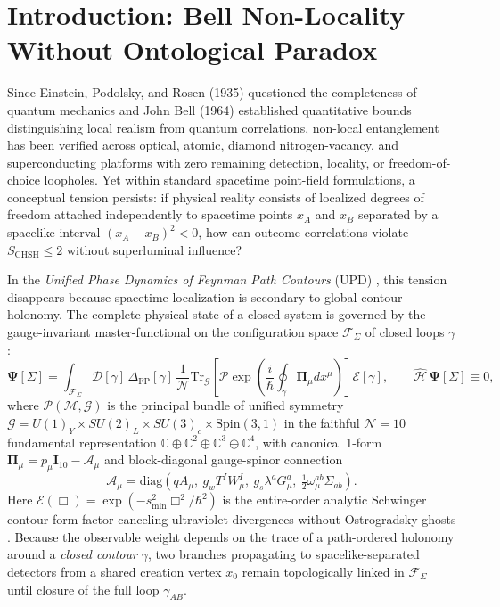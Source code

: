 \documentclass[11pt,a4paper]{article}
\begin{document}
\section{Introduction: Bell Non-Locality Without Ontological Paradox}
Since Einstein, Podolsky, and Rosen (1935) questioned the completeness of quantum mechanics and John Bell (1964) established quantitative bounds distinguishing local realism from quantum correlations, non-local entanglement has been verified across optical, atomic, diamond nitrogen-vacancy, and superconducting platforms with zero remaining detection, locality, or freedom-of-choice loopholes. Yet within standard spacetime point-field formulations, a conceptual tension persists: if physical reality consists of localized degrees of freedom attached independently to spacetime points $x_A$ and $x_B$ separated by a spacelike interval $(x_A - x_B)^2 < 0$, how can outcome correlations violate $S_{\mathrm{CHSH}} \le 2$ without superluminal influence?

In the \textit{Unified Phase Dynamics of Feynman Path Contours} (UPD) \cite{PavliukMonograph}, this tension disappears because spacetime localization is secondary to global contour holonomy. The complete physical state of a closed system is governed by the gauge-invariant master-functional on the configuration space $\mathcal{F}_\Sigma$ of closed loops $\gamma$:
\begin{equation}
\mathbf{\Psi}[\Sigma] = \int_{\mathcal{F}_\Sigma} \mathcal{D}[\gamma] \, \Delta_{\mathrm{FP}}[\gamma] \, \frac{1}{\mathcal{N}} \mathrm{Tr}_{\mathcal{G}} \left[ \mathcal{P}\exp \left( \frac{i}{\hbar} \oint_{\gamma} \mathbf{\Pi}_\mu dx^\mu \right) \right] \mathcal{E}[\gamma], \qquad \hat{\mathcal{H}}\,\mathbf{\Psi}[\Sigma] \equiv 0,
\label{eq:master_functional}
\end{equation}
where $\mathcal{P}(\mathcal{M}, \mathcal{G})$ is the principal bundle of unified symmetry $\mathcal{G} = U(1)_Y \times SU(2)_L \times SU(3)_c \times \mathrm{Spin}(3,1)$ in the faithful $\mathcal{N} = 10$ fundamental representation $\mathbb{C} \oplus \mathbb{C}^2 \oplus \mathbb{C}^3 \oplus \mathbb{C}^4$, with canonical 1-form $\mathbf{\Pi}_\mu = p_\mu \mathbf{I}_{10} - \mathbf{\mathcal{A}}_\mu$ and block-diagonal gauge-spinor connection
\begin{equation}
\mathbf{\mathcal{A}}_\mu = \mathrm{diag}\!\left( q A_\mu,\ g_w T^I W_\mu^I,\ g_s \lambda^a G_\mu^a,\ \tfrac{1}{2}\omega_\mu^{ab}\Sigma_{ab} \right).
\end{equation}
Here $\mathcal{E}(\Box) = \exp(-s_{\min}^2 \Box^2/\hbar^2)$ is the entire-order analytic Schwinger contour form-factor canceling ultraviolet divergences without Ostrogradsky ghosts \cite{PavliukMasterDeriv,PavliukEmergentGrav}. Because the observable weight depends on the trace of a path-ordered holonomy around a \emph{closed contour} $\gamma$, two branches propagating to spacelike-separated detectors from a shared creation vertex $x_0$ remain topologically linked in $\mathcal{F}_\Sigma$ until closure of the full loop $\gamma_{AB}$.
\end{document}

